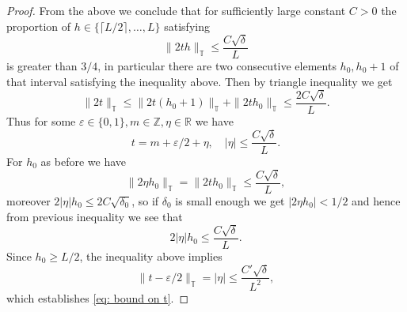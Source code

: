 \documentclass[10pt,a4paper]{amsart}
\newcommand{\T}{\mathbb T}
\begin{document}
\begin{proof}
From the above we conclude that for sufficiently large constant $C>0$ the proportion of $h \in \{ \lceil L/2 \rceil, \ldots, L \}$ satisfying
\begin{equation*} 
    \| 2th \|_{\T} \le \frac{C\sqrt{\delta}}{L}
\end{equation*}
is greater than $3/4$, in particular there are two consecutive elements $h_0,h_0+1$ of that interval satisfying the inequality above. Then by triangle inequality we get 
\begin{equation*}
    \|2 t\|_{\T} \le  \|2 t(h_0+1)\|_{\T} +  \|2 th_0\|_{\T} \le \frac{2C\sqrt{\delta}}{L}.
\end{equation*}
Thus for some $\varepsilon \in \{0,1\}, m \in \mathbb Z, \eta \in \mathbb R$ we have 
\begin{equation*}
    t=  m+\varepsilon/2+ \eta, \quad \left |\eta \right| \le  \frac{C\sqrt{\delta}}{L}.
\end{equation*}
For $h_0$ as before we have 
\begin{equation*}
    \|2 \eta h_0 \|_{\T}= \|2th_0 \|_{\T} \le \frac{C\sqrt{\delta}}{L},
\end{equation*}
moreover $2 |\eta|h_0 \le 2C\sqrt{\delta_0}$, so if $\delta_0$ is small enough we get $|2 \eta h_0|<1/2$ and hence from previous inequality we see that
\begin{equation*}
    2|\eta|h_0 \le \frac{C\sqrt{\delta}}{L}.
\end{equation*}
Since $h_0 \ge L/2$, the inequality above implies
\begin{equation} \label{eq: t-eps bound}
    \|t-\varepsilon/2 \|_{\T}=|\eta| \le \frac{C'\sqrt{\delta}}{L^2},
\end{equation}
which establishes \eqref{eq: bound on t}. 


\end{proof}
\end{document}
